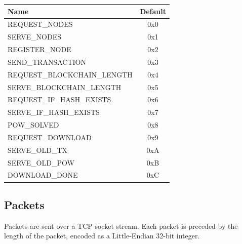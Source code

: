 \documentclass[../documentation.tex]{subfiles}
\begin{document}
\bgroup{}
\def\arraystretch{1.25}
\begin{tabular}{|l|c|}
    \hline
    \textbf{Name} & \textbf{Default}
    \\ \hline
    REQUEST\_NODES & 0x0
    \\ \hline
    SERVE\_NODES & 0x1
    \\ \hline
    REGISTER\_NODE & 0x2
    \\ \hline
    SEND\_TRANSACTION & 0x3
    \\ \hline
    REQUEST\_BLOCKCHAIN\_LENGTH & 0x4
    \\ \hline
    SERVE\_BLOCKCHAIN\_LENGTH & 0x5
    \\ \hline
    REQUEST\_IF\_HASH\_EXISTS & 0x6
    \\ \hline
    SERVE\_IF\_HASH\_EXISTS & 0x7
    \\ \hline
    POW\_SOLVED & 0x8
    \\ \hline
    REQUEST\_DOWNLOAD & 0x9
    \\ \hline
    SERVE\_OLD\_TX & 0xA
    \\ \hline
    SERVE\_OLD\_POW & 0xB
    \\ \hline
    DOWNLOAD\_DONE & 0xC
    \\ \hline

\end{tabular}
\egroup{}

\hypertarget{packets}{}
\subsection{Packets}

Packets are sent over a TCP socket stream.
Each packet is preceded by the length of the packet,
encoded as a Little-Endian 32-bit integer.


\newcommand{\tline}{
    \\ \hline
}

\newcommand{\packettabular}[1]{
    \bgroup{}
    \def\arraystretch{1.25}
    \begin{center}
        \begin{tabular}{|l|l|l|}
            \hline
            \textbf{Name} & \textbf{Type} & \textbf{Descritpion}
            \tline
            ID & u8 & Packet Identifier
            \tline

            \if\relax\detokenize{#1}\relax
            \else
                #1
                \tline
            \fi
        \end{tabular}
    \end{center}
    \egroup{}
}
\end{document}
